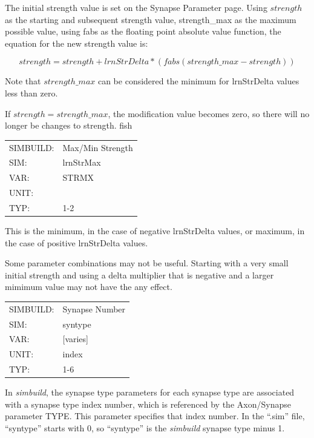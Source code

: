 \documentclass[12pt,openany,oneside]{book}
\newcommand{\prog}[1]{\textit{{#1}}}
\newcommand{\ext}[1]{{{``.#1''}}}
\newcommand{\inquotes}[1]{{{``#1''}}}
\begin{document}
The initial strength value is set on the Synapse Parameter page. Using
$strength$ as the starting and subsequent strength value, strength\_max as
the maximum possible value, using fabs as the floating point absolute
value function, the equation for the new strength value is: 

\[strength = strength + lrnStrDelta * (fabs(strength\_max - strength))\]

Note that $strength\_max$ can be considered the minimum for lrnStrDelta
values less than zero.

If $strength = strength\_max$, the modification value 
becomes zero, so there will no longer be changes to strength.
\filbreak
\vspace{\baselineskip}
fish

\begin{flushleft}
\begin{tabular}{@{}ll@{}}
SIMBUILD: & Max/Min Strength\\
SIM: & lrnStrMax\\
VAR: & STRMX\\
UNIT: & \\
TYP: & 1-2\\
\end{tabular}
\end{flushleft}
\noindent
This is the minimum, in the case of negative lrnStrDelta values, or maximum,
in the case of positive lrnStrDelta values. 

Some parameter combinations may not be
useful. Starting with a very small initial strength and using a delta
multiplier that is negative and a larger mimimum value may not have the
any effect.

\filbreak
\vspace{\baselineskip}


\begin{flushleft}
\begin{tabular}{@{}ll@{}}
SIMBUILD: & Synapse Number\\
SIM: & syntype\\
VAR: & [varies]\\
UNIT: & index\\
TYP: & 1-6\\
\end{tabular}
\end{flushleft}
\noindent
In \prog{simbuild}, the synapse type parameters for each synapse type are
associated with a synapse type index number, which is referenced by
the Axon/Synapse parameter TYPE. This parameter specifies that index
number. In the \ext{sim} file, \inquotes{syntype} starts with 0, so
\inquotes{syntype} is the
\prog{simbuild} synapse type minus 1.
\filbreak
\vspace{\baselineskip}
\end{document}
